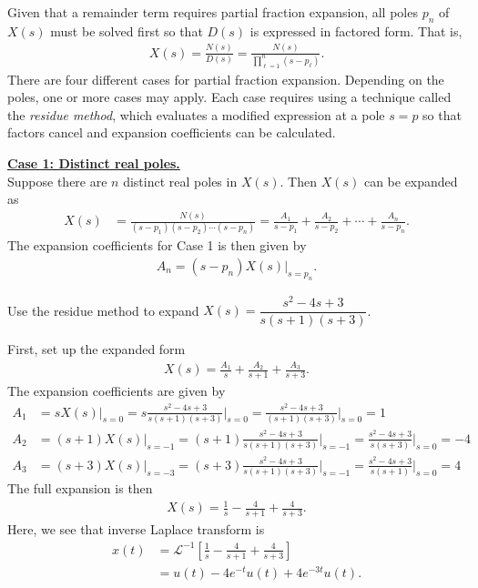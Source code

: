 \documentclass{report}
\begin{document}
Given that a remainder term requires partial fraction expansion, all poles $p_n$ of $X(s)$ must be solved first so that $D(s)$ is expressed in factored form. That is, 
\begin{align}
    X(s) = \frac{N(s)}{D(s)} = \frac{N(s)}{\prod_{\ell=1}^{n}(s-p_{\ell})}.
\end{align}
\newpage
\noindent There are four different cases for partial fraction expansion. Depending on the poles, one or more cases may apply. Each case requires using a technique called the \emph{residue method}, which evaluates a modified expression 
at a pole $s=p$ so that factors cancel and expansion coefficients can be calculated. 
\begin{tcolorbox}[width=\textwidth,colback={white}, sharp corners]
    \textbf{\underline{Case 1: Distinct real poles.}} \\[0.25cm]
    Suppose there are $n$ distinct real poles in $X(s)$. Then $X(s)$ can be expanded as 
    \begin{align}
        X(s) &= \frac{N(s)}{(s-p_1)(s-p_2)\cdots(s-p_n)}=\frac{A_1}{s-p_1}+\frac{A_2}{s-p_2}+\cdots+\frac{A_n}{s-p_n}.
    \end{align}
    The expansion coefficients for Case 1 is then given by
    \begin{align}
        A_n = (s-p_n)X(s)\big|_{s=p_n}.
    \end{align}
\end{tcolorbox}
\begin{example}
    Use the residue method to expand $X(s) = \dfrac{s^2-4s+3}{s(s+1)(s+3)}$. \\
\end{example}
\begin{solution}
    First, set up the expanded form 
    \begin{align*}
        X(s) = \frac{A_1}{s} + \frac{A_2}{s+1} + \frac{A_3}{s+3}.
    \end{align*}
    The expansion coefficients are given by 
    \begin{align*}
        A_1 &= sX(s)\big|_{s=0} = s\frac{s^2-4s+3}{s(s+1)(s+3)}\bigg|_{s=0} = \frac{s^2-4s+3}{(s+1)(s+3)}\bigg|_{s=0} = 1 \\[0.5cm]
        A_2 &= (s+1)X(s)\big|_{s=-1} = (s+1)\frac{s^2-4s+3}{s(s+1)(s+3)}\bigg|_{s=-1} = \frac{s^2-4s+3}{s(s+3)}\bigg|_{s=0} = -4 \\[0.5cm]
        A_3 &= (s+3)X(s)\big|_{s=-3} = (s+3)\frac{s^2-4s+3}{s(s+1)(s+3)}\bigg|_{s=-1} = \frac{s^2-4s+3}{s(s+1)}\bigg|_{s=0} = 4
    \end{align*}
    The full expansion is then 
    \begin{align*}
        X(s) = \frac{1}{s} - \frac{4}{s+1} + \frac{4}{s+3}.
    \end{align*}
    Here, we see that inverse Laplace transform is 
    \begin{align*}
        x(t) &= \mathcal{L}^{-1}\left[\frac{1}{s} - \frac{4}{s+1} + \frac{4}{s+3}\right] \\
        &= u(t) - 4e^{-t}u(t) + 4e^{-3t}u(t).
    \end{align*}
\end{solution}
\end{document}

